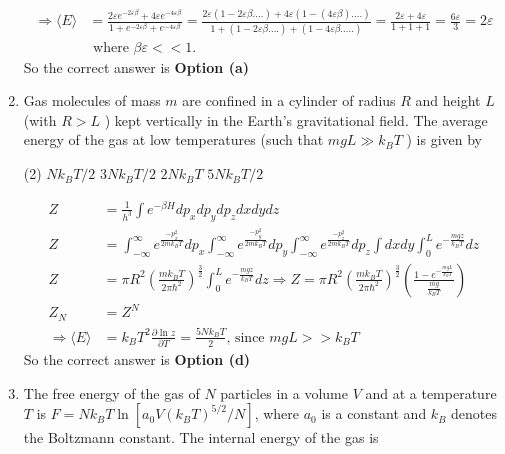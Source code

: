 \begin{enumerate}
\begin{answer}
\begin{align*}
		\Rightarrow\langle E\rangle&=\frac{2 \varepsilon e^{-2 \varepsilon \beta}+4 \varepsilon e^{-4 \varepsilon \beta}}{1+e^{-2 \varepsilon \beta}+e^{-4 \varepsilon \beta}}=\frac{2 \varepsilon(1-2 \varepsilon \beta \ldots .)+4 \varepsilon(1-(4 \varepsilon \beta) \ldots .)}{1+(1-2 \varepsilon \beta \ldots .)+(1-4 \varepsilon \beta \ldots . .)}=\frac{2 \varepsilon+4 \varepsilon}{1+1+1}=\frac{6 \varepsilon}{3}=2 \varepsilon\\
		&\text{	where }\beta \varepsilon<<1.
		\end{align*}
		So the correct answer is \textbf{Option (a)}
	\end{answer}
	\item 	Gas molecules of mass $m$ are confined in a cylinder of radius $R$ and height $L$ (with $R>L$ ) kept vertically in the Earth's gravitational field. The average energy of the gas at low temperatures (such that $m g L \gg k_{B} T$ ) is given by
	{	}
	\begin{tasks}(2)
		\task[\textbf{a.}]$N k_{B} T / 2$
		\task[\textbf{b.}]$3 N k_{B} T / 2$
		\task[\textbf{c.}]$2 N k_{B} T$
		\task[\textbf{d.}] $5 N k_{B} T / 2$
	\end{tasks}
	\begin{answer}
		\begin{align*}
		Z&=\frac{1}{h^{3}} \int e^{-\beta H} d p_{x} d p_{y} d p_{z} d x d y d z\\
		Z&=\int_{-\infty}^{\infty} e^{\frac{-p_{x}^{2}}{2 m k_{B} T}} d p_{x} \int_{-\infty}^{\infty} e^{\frac{-p_{y}^{2}}{2 m k_{B} T}} d p_{y} \int_{-\infty}^{\infty} e^{\frac{-p_{z}^{2}}{2 m k_{B} T}} d p_{z} \int d x d y \int_{0}^{L} e^{-\frac{m g z}{k_{B} T}} d z\\
		Z&=\pi R^{2}\left(\frac{m k_{B} T}{2 \pi \hbar^{2}}\right)^{\frac{3}{2}} \int_{0}^{L} e^{-\frac{m g z}{k_{B} T}} d z \Rightarrow Z=\pi R^{2}\left(\frac{m k_{B} T}{2 \pi \hbar^{2}}\right)^{\frac{3}{2}}\left(\frac{1-e^{-\frac{m g L}{k_{B} T}}}{\frac{m g}{k_{B} T}}\right)\\
		Z_{N}&=Z^{N}\\
		\Rightarrow\langle E\rangle&=k_{B} T^{2} \frac{\partial \ln z}{\partial T}=\frac{5 N k_{B} T}{2} \text {, since } m g L>>k_{B} T
		\end{align*}
		So the correct answer is \textbf{Option (d)}
	\end{answer}
	\item 	The free energy of the gas of $N$ particles in a volume $V$ and at a temperature $T$ is $F=N k_{B} T \ln \left[a_{0} V\left(k_{B} T\right)^{5 / 2} / N\right]$, where $a_{0}$ is a constant and $k_{B}$ denotes the Boltzmann constant. The internal energy of the gas is

\end{enumerate}
